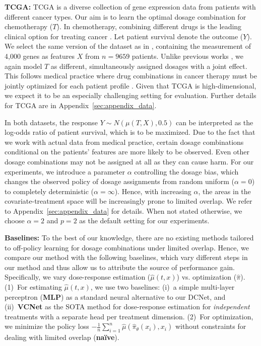 \documentclass{article}
\theoremstyle{definition}
\theoremstyle{plain}
\begin{document}
\textbf{TCGA:} TCGA \cite{Weinstein.2013} is a diverse collection of gene expression data from patients with different cancer types. Our aim is to learn the optimal dosage combination for chemotherapy ($T$). In chemotherapy, combining different drugs is the leading clinical option for treating cancer \cite{Wu.2020b}.  Let patient survival denote the outcome ($Y$). We select the same version of the dataset as in \cite{Bica.2020c, Schwab.2020}, containing the measurement of 4,000 genes as features $X$ from $n=9659$ patients. Unlike previous works \cite{Bica.2020c, Schwab.2020}, we again model $T$ as different, simultaneously assigned dosages with a joint effect. This follows medical practice where drug combinations in cancer therapy must be jointly optimized for each patient profile \cite{Fisusi.2019, Wu.2020b}. Given that TCGA is high-dimensional, we expect it to be an especially challenging setting for evaluation. Further details for TCGA are in Appendix~\ref{sec:appendix_data}.

In both datasets, the response $Y \sim N(\mu(T, X), 0.5) $ can be interpreted as the log-odds ratio of patient survival, which is to be maximized. Due to the fact that we work with actual data from medical practice, certain dosage combinations conditional on the patients' features are more likely to be observed. Even other dosage combinations may not be assigned at all as they can cause harm. For our experiments, we introduce a parameter $\alpha$ controlling the dosage bias, which changes the observed policy of dosage assignments from random uniform ($\alpha=0$) to completely deterministic ($\alpha = \infty$). Hence, with increasing $\alpha$, the areas in the covariate-treatment space will be increasingly prone to limited overlap. We refer to Appendix~\ref{sec:appendix_data} for details. When not stated otherwise, we choose $\alpha=2$ and $p=2$ as the default setting for our experiments. 

\textbf{Baselines:} To the best of our knowledge, there are no existing methods tailored to off-policy learning for dosage combinations under limited overlap. Hence, we compare our method with the following baselines, which vary different steps in our method and thus allow us to attribute the source of performance gain. Specifically, we vary dose-response estimation ($\hat{\mu}(t, x)$) vs. optimization ($\hat{\pi}$). (1)~For estimating $\hat{\mu}(t, x)$, we use two baselines: (i)~a simple multi-layer perceptron (\textbf{MLP}) as a standard neural alternative to our DCNet, and (ii)~\textbf{VCNet} \cite{Nie.2021} as the SOTA method for dose-response estimation for \emph{independent} treatments with a separate head per treatment dimension. (2)~For optimization, we minimize the policy loss $- \frac{1}{n}\sum_{i=1}^{n} \left.  \hat{\mu} \left( \hat{\pi}_{\theta}(x_i), x_i \right) \right. $ without constraints for dealing with limited overlap (\textbf{na\"ive}). 
\end{document}
